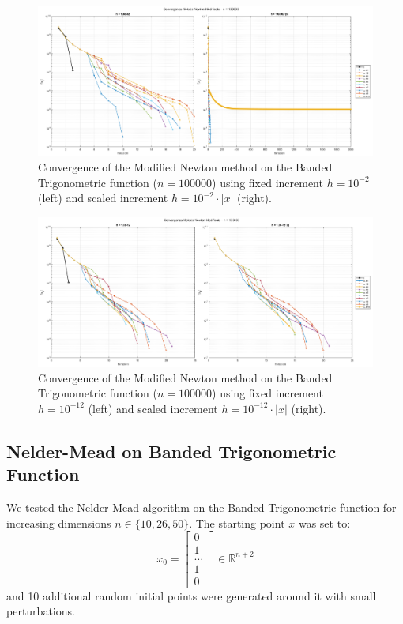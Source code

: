 \documentclass[a4paper,12pt]{article}
\begin{document}
	\newpage
	\begin{figure}[H]
		\centering
		\includegraphics[width=\textwidth]{../immagini/banded_100k_h2.png}
		\caption{Convergence of the Modified Newton method on the Banded Trigonometric function ($n=100000$) using fixed increment $h = 10^{-2}$ (left) and scaled increment $h = 10^{-2}\cdot|x|$ (right).}
		\label{fig:bt_fd_100k_h2}
	\end{figure}
	
	\begin{figure}[htbp]
		\centering
		\includegraphics[width=\textwidth]{../immagini/banded_100k_h12.png}
		\caption{Convergence of the Modified Newton method on the Banded Trigonometric function ($n=100000$) using fixed increment $h = 10^{-12}$ (left) and scaled increment $h = 10^{-12}\cdot|x|$ (right).}
		\label{fig:bt_fd_100k_h12}
	\end{figure}
	
	\subsection{Nelder-Mead on Banded Trigonometric Function}
	
	We tested the Nelder-Mead algorithm on the Banded Trigonometric function for increasing dimensions $n \in \{10, 26, 50\}$. The starting point $\bar{x}$ was set to:
	\[
	x_0 = \begin{bmatrix} 0 \\ 1 \\ \dots \\ 1 \\ 0 \end{bmatrix} \in \mathbb{R}^{n+2}
	\]
	and 10 additional random initial points were generated around it with small perturbations.
	
\end{document}
